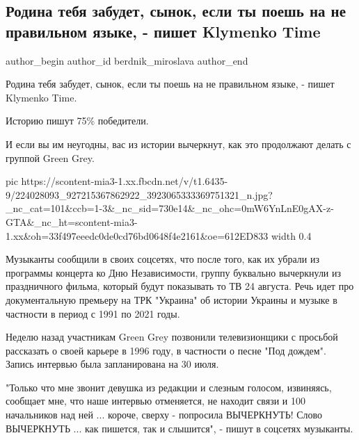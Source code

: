  
 
 
 
 
 
\subsection{Родина тебя забудет, сынок, если ты поешь на не правильном языке, - пишет Klymenko Time}
\label{sec:30_07_2021.fb.berdnik_miroslava.1.grin_grey_klymenko_time}
 
\ifcmt
 author_begin
   author_id berdnik_miroslava
 author_end
\fi

Родина тебя забудет, сынок, если ты поешь на не правильном языке, - пишет
Klymenko Time.

Историю пишут 75\% победители. 

И если вы им неугодны, вас из истории вычеркнут, как это продолжают делать с
группой Green Grey.

\ifcmt
  pic https://scontent-mia3-1.xx.fbcdn.net/v/t1.6435-9/224028093_927215367862922_3923065333369751321_n.jpg?_nc_cat=101&ccb=1-3&_nc_sid=730e14&_nc_ohc=0mW6YnLnE0gAX-z-GTA&_nc_ht=scontent-mia3-1.xx&oh=33f497eeedc0de0cd76bd0648f4e2161&oe=612ED833
  width 0.4
\fi

Музыканты сообщили в своих соцсетях, что после того, как их убрали из программы
концерта ко Дню Независимости, группу буквально вычеркнули из праздничного
фильма, который будут показывать то ТВ 24 августа. Речь идет про документальную
премьеру на ТРК "Украина" об истории Украины и музыке в частности в период с
1991 по 2021 годы. 

Неделю назад участникам Green Grey позвонили телевизионщики с просьбой
рассказать о своей карьере в 1996 году, в частности о песне "Под дождем".
Запись интервью была запланирована на 30 июля.

"Только что мне звонит девушка из редакции и слезным голосом, извиняясь,
сообщает мне, что наше интервью отменяется, не находит связи и 100 начальников
над ней ... короче, сверху - попросила ВЫЧЕРКНУТЬ! Слово ВЫЧЕРКНУТЬ ... как
пишется, так и слышится", - пишут в соцсетях музыканты.

